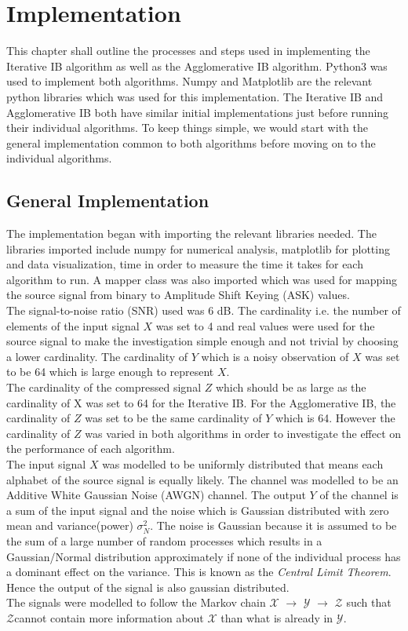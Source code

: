 \chapter{Implementation}
This chapter shall outline the processes and steps used in implementing the Iterative IB algorithm as well as the Agglomerative IB algorithm. Python3 was used to implement both algorithms. Numpy and Matplotlib are the relevant python libraries which was used for this implementation. The Iterative IB and Agglomerative IB both have similar initial implementations just before running their individual algorithms. To keep things simple, we would start with the general implementation common to both algorithms before moving on to the individual algorithms.

\section{General Implementation}
The implementation began with importing the relevant libraries needed. The libraries imported include numpy for numerical analysis, matplotlib for plotting and data visualization, time in order to measure the time it takes for each algorithm to run. A mapper class was also imported which was used for mapping the source signal from binary to Amplitude Shift Keying (ASK) values. \\
The signal-to-noise ratio (SNR) used was 6 dB. The cardinality i.e. the number of elements of the input signal $X$ was set to 4 and real values were used for the source signal to make the investigation simple enough and not trivial by choosing a lower cardinality.  The cardinality of $Y$ which is a noisy observation of $X$ was set to be 64 which is large enough to represent $X$. \\
The cardinality of the compressed signal $Z$ which should be as large as the cardinality of X was set to 64 for the Iterative IB. For the Agglomerative IB, the cardinality of $Z$ was set to be the same cardinality of $Y$ which is 64. However the cardinality of $Z$ was varied in both algorithms in order to investigate the effect on the performance of each algorithm.\\
The input signal $X$ was modelled to be uniformly distributed that means each alphabet of the source signal is equally likely. The channel was modelled to be an Additive White Gaussian Noise (AWGN) channel. The output $Y$ of the channel is a sum of the input signal and the noise which is Gaussian distributed with zero mean and variance(power) $\sigma_{N}^2$.  The noise is Gaussian because it is assumed to be the sum of a large number of random processes which results in a Gaussian/Normal  distribution approximately if none of the individual process has a dominant effect on the variance. This is known as the \emph{Central Limit Theorem}. Hence the output of the signal is also gaussian distributed.\\
The signals were modelled to follow the Markov chain $\mathcal{X}$ $\rightarrow$ $\mathcal{Y}$ $\rightarrow$ $\mathcal{Z}$ such that $\mathcal{Z}$cannot contain more information about $\mathcal{X}$ than what is already in $\mathcal{Y}$.\\

